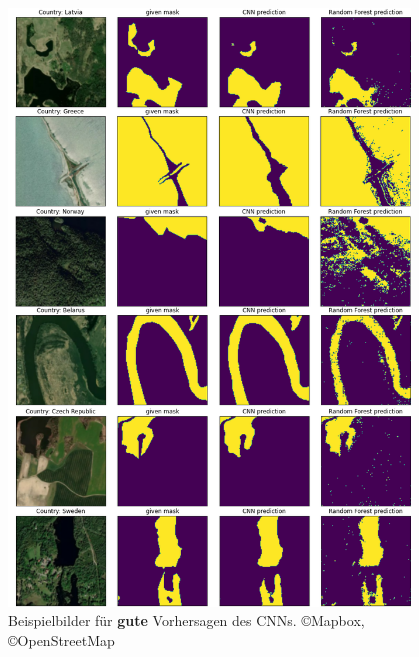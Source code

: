 \begin{figure}
    \centering
    \caption{Beispielbilder für \textbf{gute} Vorhersagen des CNNs. \copyright Mapbox, \copyright OpenStreetMap}
    \label{fig:ergebnisse_gut}
    \includegraphics[width=0.95\textwidth]{content/img/ergebnisse_gut.png}
\end{figure}

